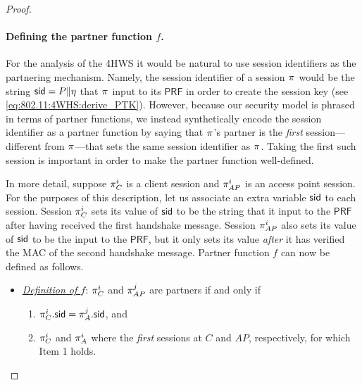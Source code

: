 \begin{proof}$\ $



\paragraph{Defining the partner function \texorpdfstring{$f$}{f}.}
For the analysis of the 4HWS it would be natural to use session identifiers as the partnering mechanism.
Namely,
the session identifier of a session $\oracle$ would be the string $\mathsf{sid} = P \| \eta$ that $\oracle$ input to its $\mathsf{PRF}$ in order to create the session key (see \cref{eq:802.11:4WHS:derive_PTK}).
However, because our security model is phrased in terms of partner functions, 
we instead synthetically encode the session identifier as a partner function by saying that $\oracle$'s partner is the \emph{first} session---different from $\oracle$---that sets the same session identifier as $\oracle$. 
Taking the first such session is important in order to make the partner function well-defined.

In more detail,
suppose  $\oracle[C][i]$ is a client session and $\oracle[AP][i]$ is an access point session.
For the purposes of this description,
let us associate an extra variable $\mathsf{sid}$ to each session.
Session $\oracle[C][i]$ sets its value of $\mathsf{sid}$ to be the string that it input to the $\mathsf{PRF}$
after having received the first handshake message.
Session $\oracle[AP][i]$ also sets its value of $\mathsf{sid}$ to be the input to the $\mathsf{PRF}$,
but it only sets its value \emph{after} it has verified the MAC of the second handshake message.
Partner function $f$ can now be defined as follows.

\begin{itemize}
\item \emph{\underline{Definition of $f$}}:  $\oracle[C][i]$ and $\oracle[AP][j]$ are partners if and only if

	\begin{enumerate}
		\item $\oracle[C][i].\sid = \oracle[A][j].\sid$, and
	
		\item $\oracle[C][i]$ and $\oracle[A][i]$ where the \emph{first} sessions at $C$ and $AP$,
		respectively, for which Item 1 holds.
	\end{enumerate}
\end{itemize}


\end{proof}
